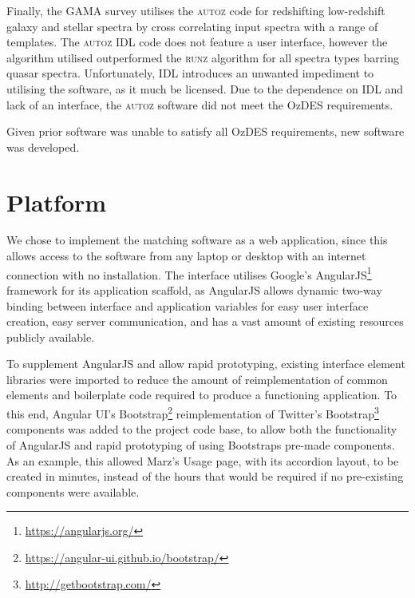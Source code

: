 \documentclass[5p]{elsarticle}
\newcommand{\runz}{\textsc{runz}}
\newcommand{\autoz}{\textsc{autoz}}
\begin{document}
Finally, the GAMA survey utilises the \autoz{} code for redshifting low-redshift galaxy and stellar spectra \citep{baldry2014galaxy} by cross correlating input spectra with a range of templates. The \autoz{} IDL code does not feature a user interface, however the algorithm utilised outperformed the \runz{} algorithm for all spectra types barring quasar spectra. Unfortunately, IDL introduces an unwanted impediment to utilising the software, as it much be licensed. Due to the dependence on IDL and lack of an interface, the \autoz{} software did not meet the OzDES requirements. 

Given prior software was unable to satisfy all OzDES requirements, new software was developed.


\section{Platform} \label{sec:platform}

We chose to implement the matching software as a web application, since this allows access to the software from any laptop or desktop with an internet connection with no installation. The interface utilises Google's AngularJS\footnote{\url{https://angularjs.org/}} framework for its application scaffold, as AngularJS allows dynamic two-way binding between interface and application variables for easy user interface creation, easy server communication, and has a vast amount of existing resources publicly available.

To supplement AngularJS and allow rapid prototyping, existing interface element libraries were imported to reduce the amount of reimplementation of common elements and boilerplate code required to produce a functioning application. To this end, Angular UI's Bootstrap\footnote{\url{https://angular-ui.github.io/bootstrap/}} reimplementation of Twitter's Bootstrap\footnote{\url{http://getbootstrap.com/}} components was added to the project code base, to allow both the functionality of AngularJS and rapid prototyping of using Bootstraps pre-made components. As an example, this allowed Marz's Usage page, with its accordion layout, to be created in minutes, instead of the hours that would be required if no pre-existing components were available.
\end{document}
